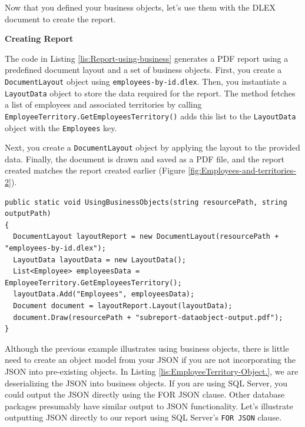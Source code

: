 \documentclass[american]{tufte-book}
\numberwithin{equation}{section}
\numberwithin{figure}{section}
\begin{document}
{{Now that you defined your business objects, let's use them with the
DLEX document to create the report.
\noindent\begin{flushleft}
\textbf{Creating Report}
\par\end{flushleft}

The code in Listing \ref{lis:Report-using-business} generates a PDF
report using a predefined document layout and a set of business objects.
First, you create a \texttt{DocumentLayout} object using \texttt{employees-by-id.dlex}.
Then, you instantiate a \texttt{LayoutData} object to store the data
required for the report. The method fetches a list of employees and
associated territories by calling \texttt{EmployeeTerritory.GetEmployeesTerritory()}
adds this list to the \texttt{LayoutData} object with the \texttt{Employees}
key.

Next, you create a \texttt{DocumentLayout} object by applying the
layout to the provided data. Finally, the document is drawn and saved
as a PDF file, and the report created matches the report created earlier
(Figure \ref{fig:Employees-and-territories-2}).

\bgroup{}
\begin{lstlisting}[caption={Report using business object.},label={lis:Report-using-business},basicstyle={\footnotesize\ttfamily},breaklines=true]
public static void UsingBusinessObjects(string resourcePath, string outputPath)
{
  DocumentLayout layoutReport = new DocumentLayout(resourcePath + "employees-by-id.dlex");
  LayoutData layoutData = new LayoutData();
  List<Employee> employeesData = EmployeeTerritory.GetEmployeesTerritory();
  layoutData.Add("Employees", employeesData);
  Document document = layoutReport.Layout(layoutData);
  document.Draw(resourcePath + "subreport-dataobject-output.pdf");
}
\end{lstlisting}
\leavevmode\egroup

Although the previous example illustrates using business objects,
there is little need to create an object model from your JSON if you
are not incorporating the JSON into pre-existing objects. In Listing
\ref{lis:EmployeeTerritory-Object.}, we are deserializing the JSON
into business objects. If you are using SQL Server, you could output
the JSON directly using the FOR JSON clause. Other database packages
presumably have similar output to JSON functionality. Let's illustrate
outputting JSON directly to our report using SQL Server's \texttt{FOR
JSON} clause.

}}
\end{document}
